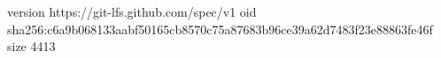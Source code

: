 version https://git-lfs.github.com/spec/v1
oid sha256:c6a9b068133aabf50165cb8570c75a87683b96ce39a62d7483f23e88863fe46f
size 4413
